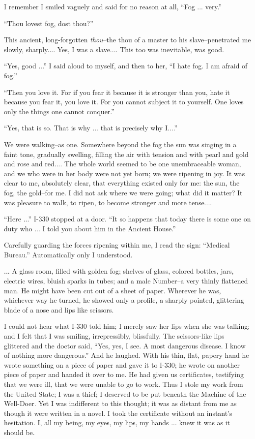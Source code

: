 \documentclass[11pt,openany]{book}
\begin{document}
I remember I smiled vaguely and said for no reason at all, ``Fog ... very.''

``Thou lovest fog, dost thou?''

This ancient, long-forgotten \emph{thou}--the thou of a master to his slave--penetrated me slowly, sharply.... Yes, I was a slave.... This too was inevitable, was good.

``Yes, good ...'' I said aloud to myself, and then to her, ``I hate fog. I am afraid of fog.''

``Then you love it. For if you fear it because it is stronger than you, hate it because you fear it, you love it. For you cannot subject it to yourself. One loves only the things one cannot conquer.''

``Yes, that is so. That is why ... that is precisely why I....''

We were walking--as one. Somewhere beyond the fog the sun was singing in a faint tone, gradually swelling, filling the air with tension and with pearl and gold and rose and red.... The whole world seemed to be one unembraceable woman, and we who were in her body were not yet born; we were ripening in joy. It was clear to me, absolutely clear, that everything existed only for me: the sun, the fog, the gold--for me. I did not ask where we were going; what did it matter? It was pleasure to walk, to ripen, to become stronger and more tense....

``Here ...'' I-330 stopped at a door. ``It so happens that today there is some one on duty who ... I told you about him in the Ancient House.''

Carefully guarding the forces ripening within me, I read the sign: ``Medical Bureau.'' Automatically only I understood.

... A glass room, filled with golden fog; shelves of glass, colored bottles, jars, electric wires, bluish sparks in tubes; and a male Number--a very thinly flattened man. He might have been cut out of a sheet of paper. Wherever he was, whichever way he turned, he showed only a profile, a sharply pointed, glittering blade of a nose and lips like scissors.

I could not hear what I-330 told him; I merely saw her lips when she was talking; and I felt that I was smiling, irrepressibly, blissfully. The scissors-like lips glittered and the doctor said, ``Yes, yes, I see. A most dangerous disease. I know of nothing more dangerous.'' And he laughed. With his thin, flat, papery hand he wrote something on a piece of paper and gave it to I-330; he wrote on another piece of paper and handed it over to me. He had given us certificates, testifying that we were ill, that we were unable to go to work. Thus I stole my work from the United State; I was a thief; I deserved to be put beneath the Machine of the Well-Doer. Yet I was indifferent to this thought; it was as distant from me as though it were written in a novel. I took the certificate without an instant's hesitation. I, all my being, my eyes, my lips, my hands ... knew it was as it should be.
\end{document}
